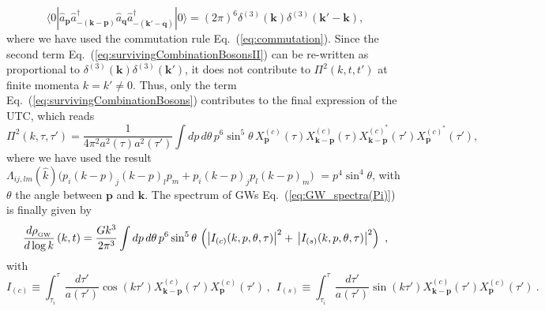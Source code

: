 \documentclass[a4paper,11pt]{article}
\newcommand{\bk}{{\mathbf k}}
\newcommand{\bp}{{\mathbf p}}
\begin{document}
\begin{equation}\label{eq:survivingCombinationBosonsII}
\langle \text{0}|\hat{a}_{\mathbf{p}}\hat{a}_{\mathbf{-(k-p)}}^{\dagger}\hat{a}_{\mathbf{q}}\hat{a}_{-(\mathbf{k'-q})}^{\dagger}|0\rangle = (2\pi)^{6}\delta^{(3)}(\mathbf{k})\delta^{(3)}(\mathbf{k'}-\bk),
\end{equation}
where we have used the commutation rule Eq.~(\ref{eq:commutation}). Since the second term Eq.~(\ref{eq:survivingCombinationBosonsII}) can be re-written as proportional to $\delta^{(3)}(\mathbf{k})\delta^{(3)}(\mathbf{k'})$, it does not contribute to $\Pi^{2}(k,t,t')$ at finite momenta $k = k' \neq {0}$. Thus, only the term Eq.~(\ref{eq:survivingCombinationBosons}) contributes to the final expression of the UTC, which reads
\begin{equation}
\Pi^{2}(k,\tau,\tau') = \frac{1}{4\pi^{2}a^{2}(\tau)a^{2}(\tau')}\int dp\, d\theta\, p^{6}\sin^{5}\theta\,X^{(c)}_{\mathbf{p}}(\tau)X^{(c)}_{\mathbf{k-p}}(\tau){X^{(c)^{*}}_{\mathbf{k-p}}}(\tau'){X^{(c)^{*}}_{\mathbf{p}}}(\tau'),
\end{equation}
where we have used the result $\Lambda_{ij,lm}(\hat{k})\big(p_{i}(k-p)_{j}(k-p)_{l}p_{m}+p_{i}(k-p)_{j}p_{l}(k-p)_{m}\big)$ $= p^{4}\sin^{4}\theta$, with $\theta$ the angle between $\bp$ and $\bk$. The spectrum of GWs Eq.~(\ref{eq:GW_spectra(Pi)}) is finally given by
\begin{eqnarray}
\frac{d\rho_{_{\rm GW}}}{d\log k}\left(k,t\right) 
= \frac{Gk^{3}}{2\pi^{3}}\int dp\, d\theta\, p^{6}\sin^{5}\theta\,\left(\left|I_{(c)}(k,p,\theta,\tau)\right|^{2}+\,\left|I_{(s)}(k,p,\theta,\tau)\right|^{2}\right)  \ , \label{eq:specGW}
\end{eqnarray}
with
\begin{equation}\label{eq:IsIc}
I_{(c)} \equiv \int_{\tau_{i}}^{\tau}\frac{d\tau'}{a(\tau')}\cos(k\tau')X^{(c)}_{\mathbf{\mathbf{k-p}}}(\tau')X^{(c)}_{\mathbf{\mathbf{p}}}(\tau')\,,~~I_{(s)} \equiv \int_{\tau_{i}}^{\tau}\frac{d\tau'}{a(\tau')}\sin(k\tau')X^{(c)}_{\mathbf{\mathbf{k-p}}}(\tau')X^{(c)}_{\mathbf{\mathbf{p}}}(\tau') \ .
\end{equation}
\end{document}
